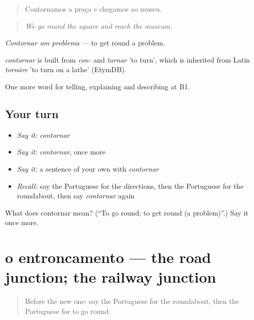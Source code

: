 \begin{quote}
Contornamos a praça e chegamos ao museu.
\end{quote}

\begin{quote}
\emph{We go round the square and reach the museum.}
\end{quote}

\emph{Contornar um problema} — to get round a problem.

\begin{cousinweb}
\emph{contornar} is built from \emph{con-} and \emph{tornar} 'to turn', which is inherited from Latin \emph{tornāre} 'to turn on a lathe' (EtymDB).
\end{cousinweb}

\begin{grammarlens}[title={What you've built}]
One more word for telling, explaining and describing at B1.
\end{grammarlens}

\subsection*{Your turn}
\begin{itemize}
\raggedright
  \item \emph{Say it:} \emph{contornar}
  \item \emph{Say it:} \emph{contornar}, once more
  \item \emph{Say it:} a sentence of your own with \emph{contornar}
  \item \emph{Recall:} say the Portuguese for the directions, then the Portuguese for the roundabout, then say \emph{contornar} again
\end{itemize}

\begin{tcolorbox}[breakable,colback=teal!4,colframe=teal!35!black,title={Before you move on}]
What does contornar mean? (\textquotedblleft{}To go round; to get round (a problem)\textquotedblright{}.) Say it once more.
\end{tcolorbox}
\section[o entroncamento]{o entroncamento — the road junction; the railway junction}

\label{lesson:PT-C436-entroncamento}



\begin{quote}
Before the new one: say the Portuguese for the roundabout, then the Portuguese for to go round.
\end{quote}

